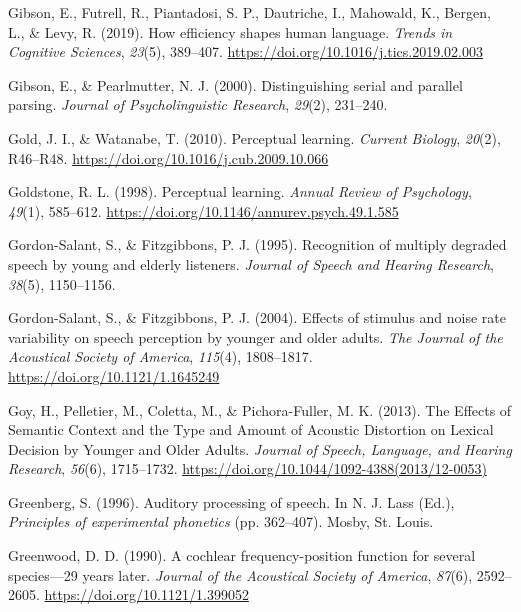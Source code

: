 \documentclass[a4paper, nobind]{templates/ociamthesis}
\newlength{\cslhangindent}
\newenvironment{CSLReferences}[2] %
 {%
  \setlength{\parindent}{0pt}
  \ifodd #1
  \let\oldpar\par
  \def\par{\hangindent=\cslhangindent\oldpar}
  \fi
  \setlength{\parskip}{1mm}
  \setlength{\baselineskip}{6mm}
 }%
 {}
\begin{document}
\begin{CSLReferences}{1}{0}
\leavevmode{}%
Gibson, E., Futrell, R., Piantadosi, S. P., Dautriche, I., Mahowald, K., Bergen, L., \& Levy, R. (2019). How efficiency shapes human language. \emph{Trends in Cognitive Sciences}, \emph{23}(5), 389--407. \url{https://doi.org/10.1016/j.tics.2019.02.003}

\leavevmode{}%
Gibson, E., \& Pearlmutter, N. J. (2000). Distinguishing serial and parallel parsing. \emph{Journal of Psycholinguistic Research}, \emph{29}(2), 231--240.

\leavevmode{}%
Gold, J. I., \& Watanabe, T. (2010). Perceptual learning. \emph{Current Biology}, \emph{20}(2), R46--R48. \url{https://doi.org/10.1016/j.cub.2009.10.066}

\leavevmode{}%
Goldstone, R. L. (1998). Perceptual learning. \emph{Annual Review of Psychology}, \emph{49}(1), 585--612. \url{https://doi.org/10.1146/annurev.psych.49.1.585}

\leavevmode{}%
Gordon-Salant, S., \& Fitzgibbons, P. J. (1995). {Recognition of multiply degraded speech by young and elderly listeners}. \emph{Journal of Speech and Hearing Research}, \emph{38}(5), 1150--1156.

\leavevmode{}%
Gordon-Salant, S., \& Fitzgibbons, P. J. (2004). {Effects of stimulus and noise rate variability on speech perception by younger and older adults}. \emph{The Journal of the Acoustical Society of America}, \emph{115}(4), 1808--1817. \url{https://doi.org/10.1121/1.1645249}

\leavevmode{}%
Goy, H., Pelletier, M., Coletta, M., \& Pichora-Fuller, M. K. (2013). {The Effects of Semantic Context and the Type and Amount of Acoustic Distortion on Lexical Decision by Younger and Older Adults}. \emph{Journal of Speech, Language, and Hearing Research}, \emph{56}(6), 1715--1732. \url{https://doi.org/10.1044/1092-4388(2013/12-0053)}

\leavevmode{}%
Greenberg, S. (1996). Auditory processing of speech. In N. J. Lass (Ed.), \emph{Principles of experimental phonetics} (pp. 362--407). Mosby, St. Louis.

\leavevmode{}%
Greenwood, D. D. (1990). {A cochlear frequency-position function for several species---29 years later}. \emph{Journal of the Acoustical Society of America}, \emph{87}(6), 2592--2605. \url{https://doi.org/10.1121/1.399052}


\end{CSLReferences}
\end{document}
